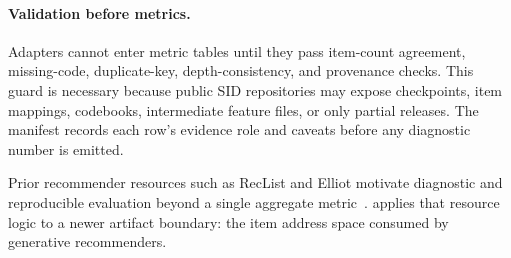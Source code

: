 \paragraph{Validation before metrics.}
Adapters cannot enter metric tables until they pass item-count agreement,
missing-code, duplicate-key, depth-consistency, and provenance checks. This
guard is necessary because public SID repositories may expose checkpoints, item
mappings, codebooks, intermediate feature files, or only partial releases. The
manifest records each row's evidence role and caveats before any diagnostic
number is emitted.

Prior recommender resources such as RecList and Elliot motivate diagnostic and
reproducible evaluation beyond a single aggregate metric~\cite{chia2022reclist,anelli2021elliot}.
\tool applies that resource logic to a newer artifact boundary: the item
address space consumed by generative recommenders.
